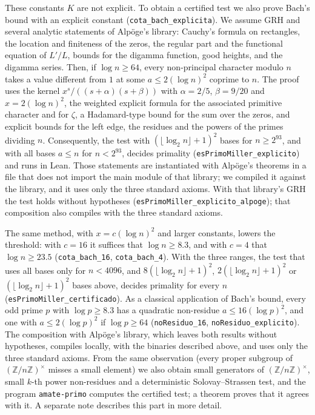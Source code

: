 \documentclass[11pt,a4paper]{amsart}
\theoremstyle{definition}
\theoremstyle{remark}
\begin{document}
These constants $K$ are not explicit. To obtain a certified test we also prove Bach's bound with an explicit constant (\texttt{cota\_bach\_explicita}). We assume GRH and several analytic statements of Alp\"oge's library: Cauchy's formula on rectangles, the location and finiteness of the zeros, the regular part and the functional equation of $L'/L$, bounds for the digamma function, good heights, and the digamma series. Then, if $\log n\ge 64$, every non-principal character modulo $n$ takes a value different from $1$ at some $a\le 2(\log n)^2$ coprime to $n$. The proof uses the kernel $x^s/((s+\alpha)(s+\beta))$ with $\alpha=2/5$, $\beta=9/20$ and $x=2(\log n)^2$, the weighted explicit formula for the associated primitive character and for $\zeta$, a Hadamard-type bound for the sum over the zeros, and explicit bounds for the left edge, the residues and the powers of the primes dividing $n$. Consequently, the test with $(\lfloor\log_2 n\rfloor+1)^2$ bases for $n\ge 2^{93}$, and with all bases $a\le n$ for $n<2^{93}$, decides primality (\texttt{esPrimoMiller\_explicito}) and runs in Lean. Those statements are instantiated with Alp\"oge's theorems in a file that does not import the main module of that library; we compiled it against the library, and it uses only the three standard axioms. With that library's GRH the test holds without hypotheses (\texttt{esPrimoMiller\_explicito\_alpoge}); that composition also compiles with the three standard axioms.

The same method, with $x=c(\log n)^2$ and larger constants, lowers the threshold: with $c=16$ it suffices that $\log n\ge 8.3$, and with $c=4$ that $\log n\ge 23.5$ (\texttt{cota\_bach\_16}, \texttt{cota\_bach\_4}). With the three ranges, the test that uses all bases only for $n<4096$, and $8(\lfloor\log_2 n\rfloor+1)^2$, $2(\lfloor\log_2 n\rfloor+1)^2$ or $(\lfloor\log_2 n\rfloor+1)^2$ bases above, decides primality for every $n$ (\texttt{esPrimoMiller\_certificado}). As a classical application of Bach's bound, every odd prime $p$ with $\log p\ge 8.3$ has a quadratic non-residue $a\le 16(\log p)^2$, and one with $a\le 2(\log p)^2$ if $\log p\ge 64$ (\texttt{noResiduo\_16}, \texttt{noResiduo\_explicito}). The composition with Alp\"oge's library, which leaves both results without hypotheses, compiles locally, with the binaries described above, and uses only the three standard axioms. From the same observation (every proper subgroup of $(\mathbb Z/n\mathbb Z)^\times$ misses a small element) we also obtain small generators of $(\mathbb Z/n\mathbb Z)^\times$, small $k$-th power non-residues and a deterministic Solovay--Strassen test, and the program \texttt{amate-primo} computes the certified test; a theorem proves that it agrees with it. A separate note describes this part in more detail.
\end{document}
